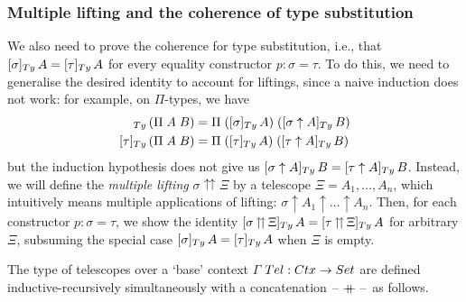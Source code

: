 \documentclass[a4paper,UKenglish,numberwithinsect,cleveref,thm-restate]{lipics-v2021}
\begin{document}
\subsubsection{Multiple lifting and the coherence of type substitution}

We also need to prove the coherence for type substitution, i.e., that $[\sigma]_{\Ty}\,A = [\tau]_{\Ty}\,A$ for every equality constructor $p : \sigma = \tau$.
To do this, we need to generalise the desired identity to account for liftings, since a naive induction does not work: for example, on $\Pi$-types, we have
\begin{align*}
  [\sigma]_{\Ty}\,(\Pi\;A\;B) & = \Pi\;([\sigma]_{\Ty}\,A)\;([\sigma\uparrow A]_{\Ty}\,B) \\
  [\tau]_{\Ty}\,(\Pi\;A\;B) & = \Pi\;([\tau]_{\Ty}\,A)\;([\tau\uparrow A]_{\Ty}\,B)
\end{align*}
but the induction hypothesis does not give us $[\sigma\uparrow A]_{\Ty}\,B = [\tau\uparrow A]_{\Ty}\,B$.
Instead, we will define the \emph{multiple lifting} $\sigma \upuparrows \Xi$ by a telescope $\Xi = A_1, \dots, A_n$, which intuitively means multiple applications of lifting: $\sigma \uparrow A_1 \uparrow \dots \uparrow A_n$.
Then, for each constructor $p : \sigma = \tau$, we show the identity
$[\sigma \mathop{\upuparrows} \Xi ]_{\Ty}\,A = [\tau \mathop{\upuparrows} \Xi ]_{\Ty}\,A$
for arbitrary $\Xi$, subsuming the special case $[\sigma ]_{\Ty}\,A = [\tau ]_{\Ty}\,A$ when $\Xi$ is empty.

The type of telescopes over a `base' context $\Gamma$ $\Tel : \Ctx \to \Set$ are defined inductive-recursively simultaneously with a concatenation $\mathord{\hspace{1pt}\text{--}\hspace{1pt}} \mathbin{+\mkern-10mu+} \mathord{\hspace{1pt}\text{--}\hspace{1pt}}$ as follows.
\end{document}
